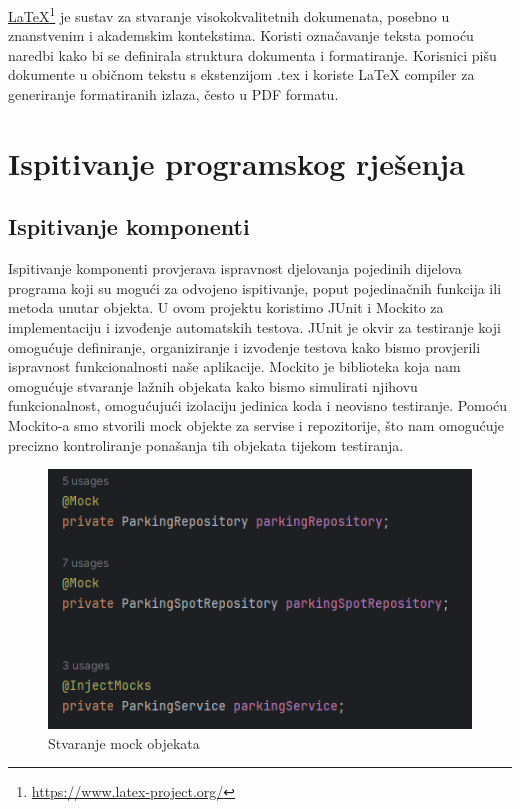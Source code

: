 \underline{LaTeX}\footnote{\url{https://www.latex-project.org/}} je sustav za stvaranje visokokvalitetnih dokumenata, posebno u znanstvenim i akademskim kontekstima. Koristi označavanje teksta pomoću naredbi kako bi se definirala struktura dokumenta i formatiranje. Korisnici pišu dokumente u običnom tekstu s ekstenzijom .tex i koriste LaTeX compiler za generiranje formatiranih izlaza, često u PDF formatu.


\eject 


\section{Ispitivanje programskog rješenja}




\subsection{Ispitivanje komponenti}

Ispitivanje komponenti provjerava ispravnost djelovanja pojedinih dijelova programa koji su mogući za odvojeno ispitivanje, poput pojedinačnih funkcija ili metoda unutar objekta. U ovom projektu koristimo JUnit i Mockito za implementaciju i izvođenje automatskih testova. JUnit je okvir za testiranje koji omogućuje definiranje, organiziranje i izvođenje testova kako bismo provjerili ispravnost funkcionalnosti naše aplikacije. Mockito je biblioteka koja nam omogućuje stvaranje lažnih objekata kako bismo simulirati njihovu funkcionalnost, omogućujući izolaciju jedinica koda i neovisno testiranje. Pomoću Mockito-a smo stvorili mock objekte za servise i repozitorije, što nam omogućuje precizno kontroliranje ponašanja tih objekata tijekom testiranja.

\begin{figure}[H]
	\includegraphics[width=\textwidth]{slike/mock.png} %
	\centering
	\caption{Stvaranje mock objekata}
	\label{fig:dijagramstanja}
\end{figure}



